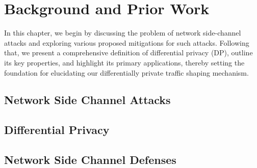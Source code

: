 \chapter{Background and Prior Work}
In this chapter, we begin by discussing the problem of network side-channel attacks and exploring various proposed mitigations for such attacks. 
Following that, we present a comprehensive definition of differential privacy (DP), outline its key properties, and highlight its primary applications, thereby setting the foundation for elucidating our differentially private traffic shaping mechanism. 

\section{Network Side Channel Attacks}\label{sec:ns-attacks}

\section{Differential Privacy}\label{sec:dp-background}


\section{Network Side Channel Defenses}\label{sec:ns-defenses}






